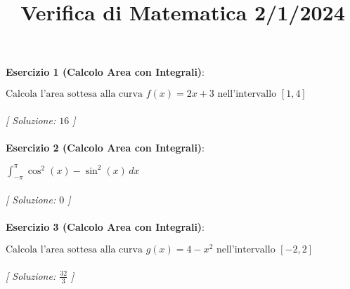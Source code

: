 \documentclass{article}
\title{\raggedright Verifica di Matematica  2/1/2024}
\date{}
\begin{document}
\maketitle

\textbf{Esercizio 1 (Calcolo Area con Integrali)}:\\
\par $\text{Calcola l'area sottesa alla curva } f(x) = 2x + 3 \text{ nell'intervallo } [1, 4]$ \\\\

\textit{[ Soluzione: $16$ ]}\\\\

\textbf{Esercizio 2 (Calcolo Area con Integrali)}:\\
\par $\int_{-\pi}^{\pi} \cos^2(x) - \sin^2(x) \,dx$ \\\\

\textit{[ Soluzione: $0$ ]}\\\\

\textbf{Esercizio 3 (Calcolo Area con Integrali)}:\\
\par $\text{Calcola l'area sottesa alla curva } g(x) = 4 - x^2 \text{ nell'intervallo } [-2, 2]$ \\\\

\textit{[ Soluzione: $\frac{32}{3}$ ]}\\\\
\end{document}
